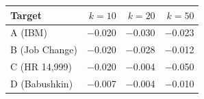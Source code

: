 \begin{tabular}{lrrr}
\hline
Target & $k=10$ & $k=20$ & $k=50$ \\
\hline
A (IBM) & $-$0.020 & $-$0.030 & $-$0.023 \\
B (Job Change) & $-$0.020 & $-$0.028 & $-$0.012 \\
C (HR 14,999) & $-$0.020 & $-$0.004 & $-$0.050 \\
D (Babushkin) & $-$0.007 & $-$0.004 & $-$0.010 \\
\hline
\end{tabular}
